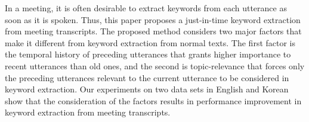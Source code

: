 In a meeting, it is often desirable to extract keywords from each utterance as soon as it is spoken. Thus, this paper proposes a just-in-time keyword
 extraction from meeting transcripts. The proposed method considers two major
 factors that make it different from keyword extraction from normal texts. The
 first factor is the temporal history of preceding utterances that grants higher
 importance to recent utterances than old ones, and the second is
 topic-relevance that forces only the preceding utterances relevant to the
 current utterance to be considered in keyword extraction. Our experiments on
 two data sets in English and Korean show that the consideration of the factors
 results in performance improvement in keyword extraction from meeting
 transcripts.


